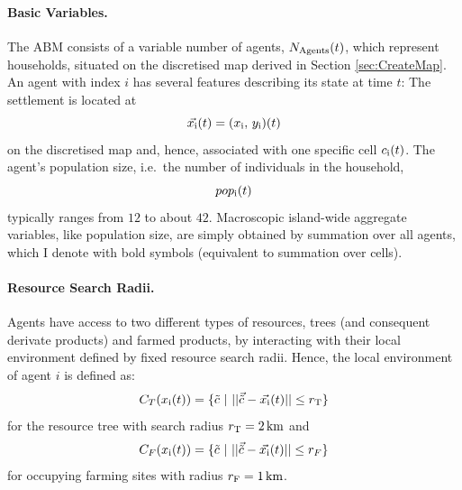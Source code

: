 \paragraph{Basic Variables.}
The ABM consists of a variable number of agents, $N_{\rm Agents}(t)$, which represent households, situated on the discretised map derived in Section \ref{sec:CreateMap}.
An agent with index $i$ has several features describing its state at time $t$:
The settlement is located at 
\begin{equation}
	\vec{x_{\rm i}}(t) = (x_{\rm i},\, y_{\rm i})(t)
\end{equation}
 on the discretised map and, hence, associated with one specific cell $c_{\rm i}(t)$.
 The agent's population size, i.e.\ the number of individuals in the household, 
 \begin{equation}pop_{\rm i}(t) \end{equation}
typically ranges from $12$ to about $42$. %
Macroscopic island-wide aggregate variables, like population size, are simply obtained by summation over all agents, which I denote with bold symbols (equivalent to summation over cells). 

\paragraph{Resource Search Radii.}
Agents have access to two different types of resources, trees (and consequent derivate products) and farmed products, by interacting with their local environment defined by fixed resource search radii.
Hence, the local environment of agent $i$ is defined as:
\begin{equation} \label{eq:Circle_T}
C_{T}(x_{\rm i}(t)) = \{ \tilde{c}\ | \   | |  \vec{\tilde{c}} - \vec{x_{\rm i}}(t) | |  \leq r_{\rm T} \} 
\end{equation}
for the resource tree with search radius $r_{\rm T} =2\, {\rm km}$ and 
\begin{equation} \label{eq:Circle_F}
C_{F}(x_{\rm i}(t)) = \{ \tilde{c}\ | \   | |  \vec{\tilde{c}} - \vec{x_{\rm i}}(t) | |  \leq r_{F} \}
\end{equation}
for occupying farming sites with radius $r_{\rm F} = 1\, {\rm km}$.

